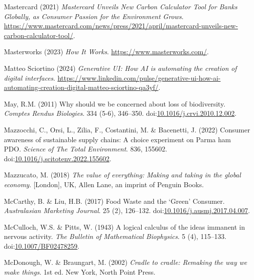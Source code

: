 \documentclass[
  letterpaper,
  DIV=11,
  numbers=noendperiod]{scrartcl}
\newlength{\cslhangindent}
\newenvironment{CSLReferences}[2] %
 {\begin{list}{}{%
  \setlength{\itemindent}{0pt}
  \setlength{\leftmargin}{0pt}
  \setlength{\parsep}{0pt}
  \ifodd #1
   \setlength{\leftmargin}{\cslhangindent}
   \setlength{\itemindent}{-1\cslhangindent}
  \fi
  \setlength{\itemsep}{#2\baselineskip}}}
 {\end{list}}
\begin{document}
\begin{CSLReferences}{0}{1}
Mastercard (2021) \emph{Mastercard {Unveils New Carbon Calculator Tool}
for {Banks Globally}, as {Consumer Passion} for the {Environment
Grows}}.
\url{https://www.mastercard.com/news/press/2021/april/mastercard-unveils-new-carbon-calculator-tool/}.

Masterworks (2023) \emph{How {It Works}}.
\url{https://www.masterworks.com/}.

Matteo Sciortino (2024) \emph{Generative {UI}: How {AI} is automating
the creation of digital interfaces}.
\url{https://www.linkedin.com/pulse/generative-ui-how-ai-automating-creation-digital-matteo-sciortino-qa3yf/}.

May, R.M. (2011) Why should we be concerned about loss of biodiversity.
\emph{Comptes Rendus Biologies}. 334 (5-6), 346--350.
doi:\href{https://doi.org/10.1016/j.crvi.2010.12.002}{10.1016/j.crvi.2010.12.002}.

Mazzocchi, C., Orsi, L., Zilia, F., Costantini, M. \& Bacenetti, J.
(2022) Consumer awareness of sustainable supply chains: {A} choice
experiment on {Parma} ham {PDO}. \emph{Science of The Total
Environment}. 836, 155602.
doi:\href{https://doi.org/10.1016/j.scitotenv.2022.155602}{10.1016/j.scitotenv.2022.155602}.

Mazzucato, M. (2018) \emph{The value of everything: Making and taking in
the global economy}. {[}London{]}, UK, Allen Lane, an imprint of Penguin
Books.

McCarthy, B. \& Liu, H.B. (2017) Food {Waste} and the {`{Green}'}
{Consumer}. \emph{Australasian Marketing Journal}. 25 (2), 126--132.
doi:\href{https://doi.org/10.1016/j.ausmj.2017.04.007}{10.1016/j.ausmj.2017.04.007}.

McCulloch, W.S. \& Pitts, W. (1943) A logical calculus of the ideas
immanent in nervous activity. \emph{The Bulletin of Mathematical
Biophysics}. 5 (4), 115--133.
doi:\href{https://doi.org/10.1007/BF02478259}{10.1007/BF02478259}.

McDonough, W. \& Braungart, M. (2002) \emph{Cradle to cradle: Remaking
the way we make things}. 1st ed. New York, North Point Press.


\end{CSLReferences}
\end{document}

